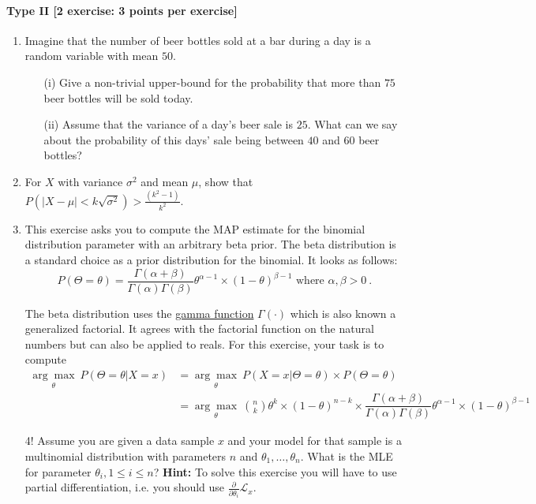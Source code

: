 \documentclass{article}
\begin{document}
\paragraph{Type II [2 exercise: 3 points per exercise]}
\begin{enumerate}
	\item Imagine that the number of beer bottles sold at a bar during a day is a random variable with mean $50$.
		\begin{itemize}
			\item[(i)] Give a non-trivial upper-bound for the probability that more than $75$ beer bottles will be sold today.
			\item[(ii)] Assume that the variance of a day's beer sale is $25$. What can we say about the probability of this days' sale being between $40$ and $60$ beer bottles?
		\end{itemize}
	
	\item For $X$ with variance $\sigma^2$ and mean $\mu$, show that $P( |X-\mu | < k \sqrt{\sigma^2} ) > \frac{(k^2 -1)}{k^2}$.
	
	\item This exercise asks you to compute the MAP estimate for the binomial distribution parameter with an arbitrary beta prior. The beta distribution
	is a standard choice as a prior distribution for the binomial. It looks as follows:
	\begin{equation*}
	P(\Theta=\theta) = \dfrac{\Gamma(\alpha + \beta)}{\Gamma(\alpha)\Gamma(\beta)}\theta^{\alpha-1} \times (1-\theta)^{\beta-1} \mbox{ where } \alpha, \beta > 0 \ .
	\end{equation*}
	
	The beta distribution uses the \href{https://en.wikipedia.org/wiki/Gamma_function}{gamma function} $ \Gamma(\cdot) $ which is also known a generalized factorial.
	It agrees with the factorial function on the natural numbers but can also be applied to reals.	
	For this exercise, your task is to compute
	\begin{align*}
	\underset{\theta}{\arg\max}~P(\Theta=\theta|X=x) &= \underset{\theta}{\arg\max}~P(X =x |\Theta = \theta) \times P(\Theta = \theta) \\
	&= \underset{\theta}{\arg\max}~\binom{n}{k}\theta^{k}\times (1-\theta)^{n-k} \times \dfrac{\Gamma(\alpha + \beta)}{\Gamma(\alpha)\Gamma(\beta)}\theta^{\alpha-1} \times (1-\theta)^{\beta-1}
	\end{align*}

\item[4!] Assume you are given a data sample $ x $ and your model for that sample is a multinomial distribution with parameters $ n $ and 
	$ \theta_{1}, \ldots, \theta_{n} $. What is the MLE for parameter $ \theta_{i}, 1 \leq i \leq n $? \textbf{Hint:} To solve this exercise you will
	have to use partial differentiation, i.e. you should use $ \frac{\partial}{\partial\theta_{i}}\mathcal{L}_{x} $.
\end{enumerate}
\end{document}
